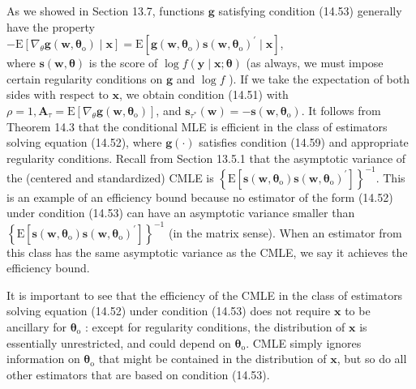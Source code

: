 \documentclass[10pt]{article}
\begin{document}
As we showed in Section 13.7, functions $\mathbf{g}$ satisfying condition (14.53) generally have the property\\
$-\mathrm{E}\left[\nabla_{\theta} \mathbf{g}\left(\mathbf{w}, \boldsymbol{\theta}_{\mathrm{o}}\right) \mid \mathbf{x}\right]=\mathrm{E}\left[\mathbf{g}\left(\mathbf{w}, \boldsymbol{\theta}_{\mathrm{o}}\right) \mathbf{s}\left(\mathbf{w}, \boldsymbol{\theta}_{\mathrm{o}}\right)^{\prime} \mid \mathbf{x}\right]$,\\
where $\mathbf{s}(\mathbf{w}, \boldsymbol{\theta})$ is the score of $\log f(\mathbf{y} \mid \mathbf{x} ; \boldsymbol{\theta})$ (as always, we must impose certain regularity conditions on $\mathbf{g}$ and $\log f$ ). If we take the expectation of both sides with respect to $\mathbf{x}$, we obtain condition (14.51) with $\rho=1, \mathbf{A}_{\tau}=\mathrm{E}\left[\nabla_{\theta} \mathbf{g}\left(\mathbf{w}, \boldsymbol{\theta}_{\mathrm{o}}\right)\right]$, and $\mathbf{s}_{\tau^{*}}(\mathbf{w})= -\mathbf{s}\left(\mathbf{w}, \boldsymbol{\theta}_{\mathrm{o}}\right)$. It follows from Theorem 14.3 that the conditional MLE is efficient in the class of estimators solving equation (14.52), where $\mathbf{g}(\cdot)$ satisfies condition (14.59) and appropriate regularity conditions. Recall from Section 13.5.1 that the asymptotic variance of the (centered and standardized) CMLE is $\left\{\mathrm{E}\left[\mathbf{s}\left(\mathbf{w}, \boldsymbol{\theta}_{\mathrm{o}}\right) \mathbf{s}\left(\mathbf{w}, \boldsymbol{\theta}_{\mathrm{o}}\right)^{\prime}\right]\right\}^{-1}$. This is an example of an efficiency bound because no estimator of the form (14.52) under condition (14.53) can have an asymptotic variance smaller than $\left\{\mathrm{E}\left[\mathbf{s}\left(\mathbf{w}, \boldsymbol{\theta}_{\mathrm{o}}\right) \mathbf{s}\left(\mathbf{w}, \boldsymbol{\theta}_{\mathrm{o}}\right)^{\prime}\right]\right\}^{-1}$ (in the matrix sense). When an estimator from this class has the same asymptotic variance as the CMLE, we say it achieves the efficiency bound.

It is important to see that the efficiency of the CMLE in the class of estimators solving equation (14.52) under condition (14.53) does not require $\mathbf{x}$ to be ancillary for $\boldsymbol{\theta}_{\mathrm{o}}$ : except for regularity conditions, the distribution of $\mathbf{x}$ is essentially unrestricted, and could depend on $\boldsymbol{\theta}_{\mathrm{o}}$. CMLE simply ignores information on $\boldsymbol{\theta}_{\mathrm{o}}$ that might be contained in the distribution of $\mathbf{x}$, but so do all other estimators that are based on condition (14.53).
\end{document}

